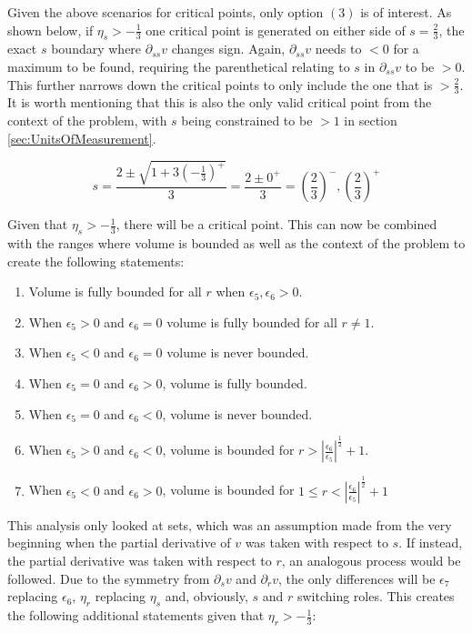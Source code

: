 Given the above scenarios for critical points, only option $(3)$ is of interest. As shown below, if $\eta_s> -\frac{1}{3}$ one critical point is generated on either side of $s=\frac{2}{3}$, the exact $s$ boundary where $\partial_{ss} v$ changes sign. Again, $\partial_{ss} v$ needs to $<0$ for a maximum to be found, requiring the parenthetical relating to $s$ in $\partial_{ss} v$ to be $>0$. This further narrows down the critical points to only include the one that is $>\frac{2}{3}$. It is worth mentioning that this is also the only valid critical point from the context of the problem, with $s$ being constrained to be $>1$ in section \ref{sec:UnitsOfMeasurement}.

\begin{equation*}
    s=\frac{2\pm \sqrt{1+3\left( -\frac{1}{3} \right)^+}}{3}=\frac{2\pm 0^+}{3}=\left( \frac{2}{3} \right)^-, \left( \frac{2}{3} \right)^+
\end{equation*}

Given that $\eta_s>-\frac{1}{3}$, there will be a critical point. This can now be combined with the ranges where volume is bounded as well as the context of the problem to create the following statements:

\begin{enumerate}
    \item Volume is fully bounded for all $r$ when $\epsilon_5,\epsilon_6>0$.
    \item When $\epsilon_5>0$ and $\epsilon_6=0$ volume is fully bounded for all $r\ne 1$.
    \item When $\epsilon_5<0$ and $\epsilon_6=0$ volume is never bounded.
    \item When $\epsilon_5=0$ and $\epsilon_6>0$, volume is fully bounded.
    \item When $\epsilon_5=0$ and $\epsilon_6<0$, volume is never bounded.
    \item When $\epsilon_5>0$ and $\epsilon_6<0$, volume is bounded for $r>\left| \frac{\epsilon_6}{\epsilon_5} \right|^\frac{1}{2}+1$.
    \item When $\epsilon_5<0$ and $\epsilon_6>0$, volume is bounded for $1\le r < \left| \frac{\epsilon_6}{\epsilon_5} \right|^\frac{1}{2}+1$
\end{enumerate}

This analysis only looked at sets, which was an assumption made from the very beginning when the partial derivative of $v$ was taken with respect to $s$. If instead, the partial derivative was taken with respect to $r$, an analogous process would be followed. Due to the symmetry from $\partial_sv$ and $\partial_r v$, the only differences will be $\epsilon_7$ replacing $\epsilon_6$, $\eta_r$ replacing $\eta_s$ and, obviously, $s$ and $r$ switching roles. This creates the following additional statements given that $\eta_r>-\frac{1}{3}$:

